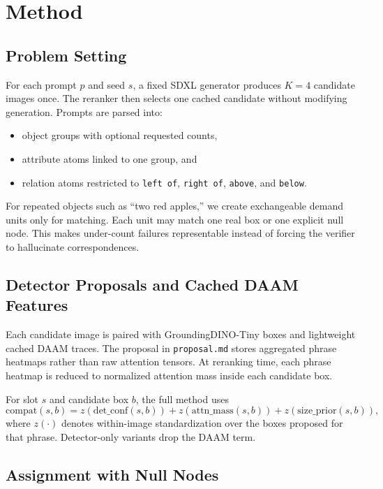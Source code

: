 \documentclass{article}
\newcommand{\daam}{DAAM\xspace}
\newcommand{\sdxl}{SDXL\xspace}
\begin{document}
\section{Method}
\label{sec:method}

\subsection{Problem Setting}

For each prompt $p$ and seed $s$, a fixed \sdxl generator produces $K=4$ candidate images once. The reranker then selects one cached candidate without modifying generation. Prompts are parsed into:
\begin{itemize}[leftmargin=*,topsep=2pt,itemsep=2pt]
  \item object groups with optional requested counts,
  \item attribute atoms linked to one group, and
  \item relation atoms restricted to \texttt{left of}, \texttt{right of}, \texttt{above}, and \texttt{below}.
\end{itemize}

For repeated objects such as ``two red apples,'' we create exchangeable demand units only for matching. Each unit may match one real box or one explicit null node. This makes under-count failures representable instead of forcing the verifier to hallucinate correspondences.

\subsection{Detector Proposals and Cached \daam Features}

Each candidate image is paired with GroundingDINO-Tiny boxes and lightweight cached \daam traces. The proposal in \texttt{proposal.md} stores aggregated phrase heatmaps rather than raw attention tensors. At reranking time, each phrase heatmap is reduced to normalized attention mass inside each candidate box.

For slot $s$ and candidate box $b$, the full method uses
\begin{equation}
\mathrm{compat}(s,b) =
z(\mathrm{det\_conf}(s,b)) +
z(\mathrm{attn\_mass}(s,b)) +
z(\mathrm{size\_prior}(s,b)),
\end{equation}
where $z(\cdot)$ denotes within-image standardization over the boxes proposed for that phrase. Detector-only variants drop the \daam term.

\subsection{Assignment with Null Nodes}
\end{document}
